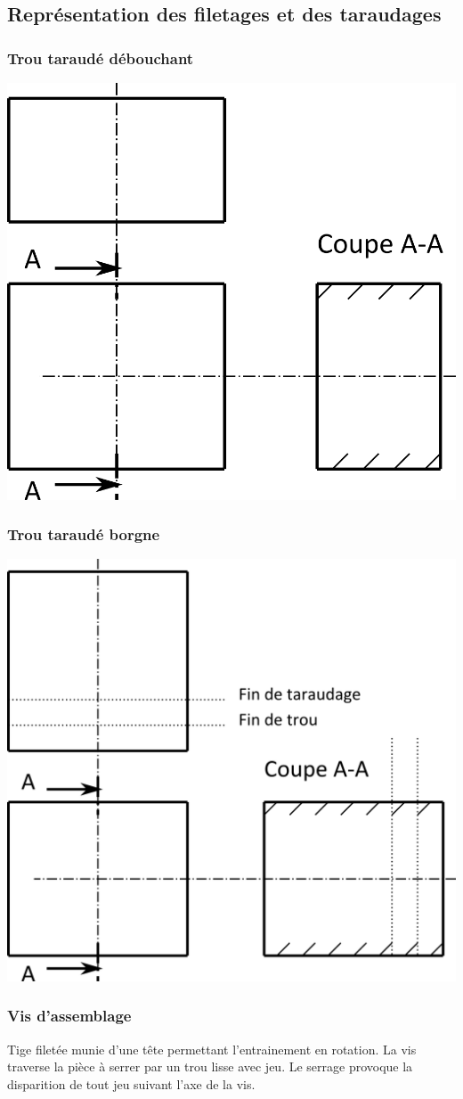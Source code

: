 \documentclass[11pt,oneside]{article}
\begin{document}
\subsection{Représentation des filetages et des taraudages}
\subsubsection{Trou taraudé débouchant}

\begin{center}
\includegraphics[width=.6\textwidth]{png/taraudage_debouchant_e}
\end{center}

\subsubsection{Trou taraudé borgne}

\begin{center}
\includegraphics[width=.6\textwidth]{png/taraudage_borgne_e}
\end{center}

\subsubsection{Vis d'assemblage}
\begin{defi}

Tige filetée munie d'une tête permettant l'entrainement en rotation. La vis traverse la pièce à serrer par un trou lisse avec jeu. Le serrage provoque la disparition de tout jeu suivant l'axe de la vis. 

\end{defi}
\end{document}
